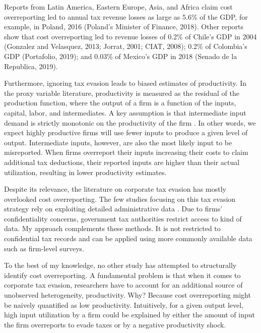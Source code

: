 \documentclass[
  12pt]{article}
\theoremstyle{definition}
\theoremstyle{remark}
\begin{document}
Reports from Latin America, Eastern Europe, Asia, and Africa claim cost
overreporting led to annual tax revenue losses as large as 5.6\% of the
GDP, for example, in Poland, 2016 (Poland's Minister of Finance, 2018).
Other reports show that cost overreporting led to revenue losses of
0.2\% of Chile's GDP in 2004 (Gonzalez and Velasquez, 2013; Jorrat,
2001; CIAT, 2008); 0.2\% of Colombia's GDP (Portafolio, 2019); and
0.03\% of Mexico's GDP in 2018 (Senado de la Republica, 2019).

Furthermore, ignoring tax evasion leads to biased estimates of
productivity. In the proxy variable literature, productivity is measured
as the residual of the production function, where the output of a firm
is a function of the inputs, capital, labor, and intermediates. A key
assumption is that intermediate input demand is strictly monotonic on
the productivity of the firm
\citep{Gandhi2020, Ackerberg2015, Levinsohn2003}. In other words, we
expect highly productive firms will use fewer inputs to produce a given
level of output. Intermediate inputs, however, are also the most likely
input to be misreported. When firms overreport their inputs increasing
their costs to claim additional tax deductions, their reported inputs
are higher than their actual utilization, resulting in lower
productivity estimates.

Despite its relevance, the literature on corporate tax evasion has
mostly overlooked cost overreporting. The few studies focusing on this
tax evasion strategy rely on exploiting detailed administrative data
\citep{Zumaya2021, Carrillo2022}. Due to firms' confidentiality
concerns, government tax authorities restrict access to kind of data. My
approach complements these methods. It is not restricted to confidential
tax records and can be applied using more commonly available data such
as firm-level surveys.

To the best of my knowledge, no other study has attempted to
structurally identify cost overreporting. A fundamental problem is that
when it comes to corporate tax evasion, researchers have to account for
an additional source of unobserved heterogeneity, productivity. Why?
Because cost overreporting might be naively quantified as low
productivity. Intuitively, for a given output level, high input
utilization by a firm could be explained by either the amount of input
the firm overreports to evade taxes or by a negative productivity shock.
\end{document}
